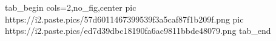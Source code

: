  
 
 
 
 
\zzSecCmtScr

\ifcmt
  tab_begin cols=2,no_fig,center
     pic https://i2.paste.pics/57d6011467399539f3a5caf87f1b209f.png
		 pic https://i2.paste.pics/ed7d39dbc18190fa6ac9811bbde48079.png
  tab_end
\fi
